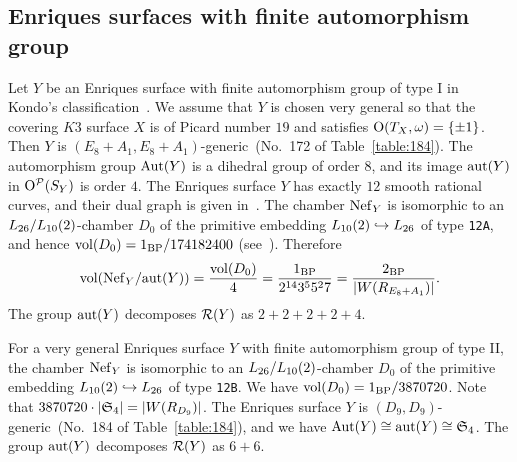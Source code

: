 \documentclass{amsart}
\numberwithin{procedure}{section}
\begin{document}
\subsection{Enriques surfaces with finite automorphism group}\label{subsec:finiteAut}
%
Let $Y$ be an Enriques surface
with finite automorphism group
of type I in Kondo's classification~\cite{Kondo1986}.
We assume that  $Y$  is chosen very general
so that the covering $K3$ surface $X$ is
of Picard number $19$ and satisfies $\mathord{\mathrm{O}}(T_X, \omega)=\{\pm 1\}$.
Then $Y$ is $(E_8+A_1, E_8+A_1)$-generic~(No.~172 of Table~\ref{table:184}).
The automorphism group $\operatorname{\mathrm{Aut}}\nolimits(Y)$ is
a dihedral group of order $8$,
and its image $\mathord{\rm{aut}}(Y)$ in $\mathord{\mathrm{O}}^{\mathord{\mathcal P}}(S_{Y})$
is order $4$.
The Enriques surface $Y$ has exactly $12$ smooth rational curves,
and their dual graph is given in~\cite[Fig.~1.4]{Kondo1986}.
The chamber $\mathord{\rm Nef}_{Y}$ is isomorphic to an $L_{26}/L_{10}(2)$-chamber $D_0$
of the primitive embedding $L_{10}(2)\hookrightarrow L_{26}$
of type {\tt 12A}, and hence 
$\mathord{\rm{vol}}(D_0)=1_{\mathord{\rm{BP}}}/174182400$ (see~\cite{BS2019}).
Therefore
\[
\mathord{\rm{vol}}(\mathord{\rm Nef}_{Y}/\mathord{\rm{aut}}(Y))=\frac{\mathord{\rm{vol}}(D_0)}{4}=\frac{1_{\mathord{\rm{BP}}}}{2^{14} 3^5 5^2 7}
=\frac{2_{\mathord{\rm{BP}}}}{ |W(R_{E_8+A_1})|}.
\]
The group $\mathord{\rm{aut}}(Y)$ decomposes $\mathord{\mathcal R}(Y)$
as $2+2+2+2+4$.
%
\par
For a very general  Enriques surface $Y$
with finite automorphism group
of type II,
the chamber 
 $\mathord{\rm Nef}_{Y}$ is isomorphic to an $L_{26}/L_{10}(2)$-chamber $D_0$
of the primitive embedding $L_{10}(2)\hookrightarrow L_{26}$
of type {\tt 12B}.
We have $\mathord{\rm{vol}}(D_0)=1_{\mathord{\rm{BP}}}/3870720$.
Note that $3870720\cdot |\mathord{\mathfrak S}_4|=|W(R_{D_9})|$.
The Enriques surface $Y$ is $(D_9, D_9)$-generic~(No.~184 of Table~\ref{table:184}),
and we have  $\operatorname{\mathrm{Aut}}\nolimits(Y)\cong \mathord{\rm{aut}}(Y)\cong \mathord{\mathfrak S}_4$.
The group $\mathord{\rm{aut}}(Y)$  decomposes $\mathord{\mathcal R}(Y)$
as $6+6$.
%
%

%
\end{document}
